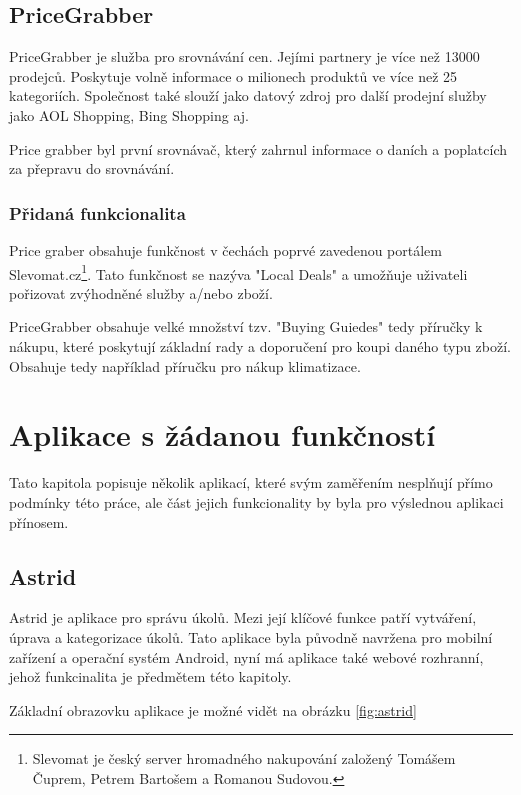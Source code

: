 \subsection{PriceGrabber}
PriceGrabber je služba pro srovnávání cen. Jejími partnery je více než 13000 prodejců. Poskytuje volně informace o milionech produktů ve více než 25 kategoriích. Společnost také slouží jako datový zdroj pro další prodejní služby jako AOL Shopping, Bing Shopping aj. \cite{website:wiki:pricegrabber}

Price grabber byl první srovnávač, který zahrnul informace o daních a poplatcích za přepravu do srovnávání. \cite{website:wiki:pricegrabber}

\subsubsection{Přidaná funkcionalita}
Price graber obsahuje funkčnost v čechách poprvé zavedenou portálem Slevomat.cz\footnote{Slevomat je český server hromadného nakupování založený Tomášem Čuprem, Petrem Bartošem a Romanou Sudovou.}. Tato funkčnost se nazýva "Local Deals" a umožňuje uživateli pořizovat zvýhodněné služby a/nebo zboží.

PriceGrabber obsahuje velké množství tzv. "Buying Guiedes" tedy příručky k nákupu, které poskytují základní rady a doporučení pro koupi daného typu zboží. Obsahuje tedy například příručku pro nákup klimatizace.

\section{Aplikace s žádanou funkčností}
\label{sec:aplikace-s-zadanou-funkcnosti}
Tato kapitola popisuje několik aplikací, které svým zaměřením nesplňují přímo podmínky této práce, ale část jejich funkcionality by byla pro výslednou aplikaci přínosem.

\subsection{Astrid}
\label{sec:astrid}
Astrid je aplikace pro správu úkolů. Mezi její klíčové funkce patří vytváření, úprava a kategorizace úkolů. Tato aplikace byla původně navržena pro mobilní zařízení a operační systém Android, nyní má aplikace také webové rozhranní, jehož funkcinalita je předmětem této kapitoly.

Základní obrazovku aplikace je možné vidět na obrázku \ref{fig:astrid}

